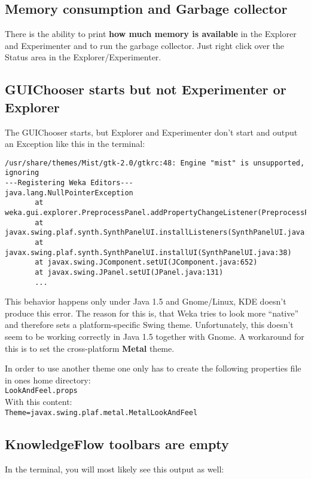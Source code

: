 \subsection{Memory consumption and Garbage collector}
There is the ability to print \textbf{how much memory is available} in the
Explorer and Experimenter and to run the garbage collector. Just right
click over the Status area in the Explorer/Experimenter.

\subsection{GUIChooser starts but not Experimenter or Explorer}
\label{GUIChooserButNotExplorer}
The GUIChooser starts, but Explorer and Experimenter don't start and
output an Exception like this in the terminal:

\begin{verbatim}
/usr/share/themes/Mist/gtk-2.0/gtkrc:48: Engine "mist" is unsupported, ignoring
---Registering Weka Editors---
java.lang.NullPointerException
       at weka.gui.explorer.PreprocessPanel.addPropertyChangeListener(PreprocessPanel.java:519)
       at javax.swing.plaf.synth.SynthPanelUI.installListeners(SynthPanelUI.java:49)
       at javax.swing.plaf.synth.SynthPanelUI.installUI(SynthPanelUI.java:38)
       at javax.swing.JComponent.setUI(JComponent.java:652)
       at javax.swing.JPanel.setUI(JPanel.java:131) 
       ...
\end{verbatim}

\noindent This behavior happens only under Java 1.5 and Gnome/Linux,
KDE doesn't produce this error. The reason for this is, that Weka
tries to look more ``native'' and therefore sets a platform-specific
Swing theme. Unfortunately, this doesn't seem to be working correctly
in Java 1.5 together with Gnome. A workaround for this is to set the
cross-platform \textbf{Metal} theme.

In order to use another theme one only has to create the following
properties file in ones home directory:\\

\verb=LookAndFeel.props=\\

\noindent With this content:\\

\verb^Theme=javax.swing.plaf.metal.MetalLookAndFeel^\\

\subsection{KnowledgeFlow toolbars are empty}
In the terminal, you will most likely see this output as well:\\

